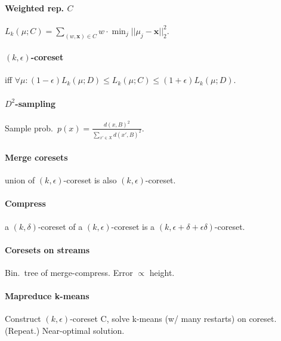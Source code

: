 \documentclass[9pt]{scrartcl}
\DeclareMathOperator{\argmin}{argmin}
\newcommand{\eps}{\epsilon}
\begin{document}
\begin{twocolumn}
\paragraph{Weighted rep. $C$} $L_k(\mu;C) = \sum_{(w,\bm x)\in C}w\cdot\min_j||\mu_j - \bm x||_2^2$.

\paragraph{$(k,\eps)$-coreset} iff $\forall\mu: (1-\eps)L_k(\mu;D) \leq L_k(\mu;C) \leq (1+\eps)L_k(\mu;D)$.

\paragraph{$D^2$-sampling}
Sample prob.\ $p(x) = \frac{d(x,B)^2}{\sum_{x' \in X} d(x', B)^2}$.


\paragraph{Merge coresets} union of $(k,\eps)$-coreset is also $(k,\eps)$-coreset.

\paragraph{Compress} a $(k,\delta)$-coreset of a $(k,\eps)$-coreset is a $(k,\eps+\delta+\eps\delta)$-coreset.

\paragraph{Coresets on streams} Bin.\ tree of merge-compress. Error $\propto$ height.

\paragraph{Mapreduce k-means} Construct $(k,\eps)$-coreset C, solve k-means (w/ many restarts) on coreset. (Repeat.) Near-optimal solution.


\end{twocolumn}
\end{document}
